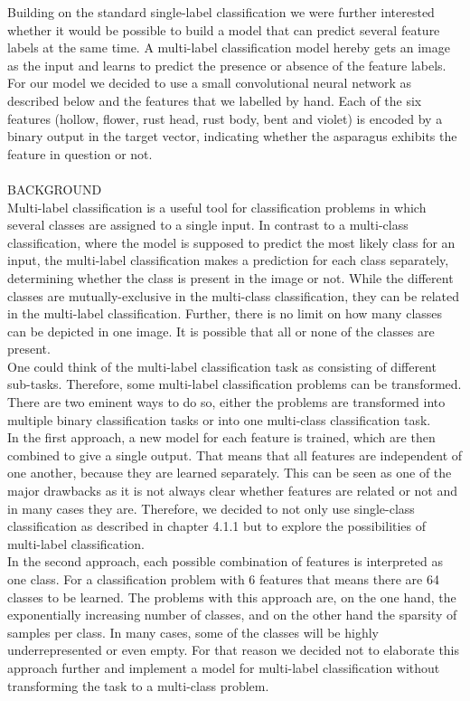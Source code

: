 Building on the standard single-label classification we were further interested whether it would be possible to build a model that can predict several feature labels at the same time. A multi-label classification model hereby gets an image as the input and learns to predict the presence or absence of  the feature labels. \\
For our model we decided to use a small convolutional neural network as described below and the features that we labelled by hand. Each of the six features (hollow, flower, rust head, rust body, bent and violet) is encoded by a binary output in the target vector, indicating whether the asparagus exhibits the feature in question or not. \\
\\
BACKGROUND \\
Multi-label classification is a useful tool for classification problems in which several classes are assigned to a single input. In contrast to a multi-class classification, where the model is supposed to predict the most likely class for an input, the multi-label classification makes a prediction for each class separately, determining whether the class is present in the image or not. While the different classes are mutually-exclusive in the multi-class classification, they can be related in the multi-label classification. Further, there is no limit on how many classes can be depicted in one image. It is possible that all or none of the classes are present. \\
One could think of the multi-label classification task as consisting of different sub-tasks. Therefore, some multi-label classification problems can be transformed. There are two eminent ways to do so, either the problems  are transformed into multiple binary classification tasks or into one multi-class classification task. \\
In the first approach, a new model for each feature is trained, which are then combined to give a single output. That means that all features are independent of one another, because they are learned separately. This can be seen as one of the major drawbacks as it is not always clear whether features are related or not and in many cases they are.
Therefore, we decided to not only use single-class classification as described in chapter 4.1.1 but to explore the possibilities of multi-label classification. \\
In the second approach, each possible combination of features is interpreted as one class. For a classification problem with 6 features that means there are 64 classes to be learned. The problems with this approach are, on the one hand, the exponentially increasing number of classes, and on the other hand the sparsity of samples per class. In many cases, some of the classes will be highly underrepresented or even empty. For that reason we decided not to elaborate this approach further and implement a model for multi-label classification without transforming the task to a multi-class problem. \\
